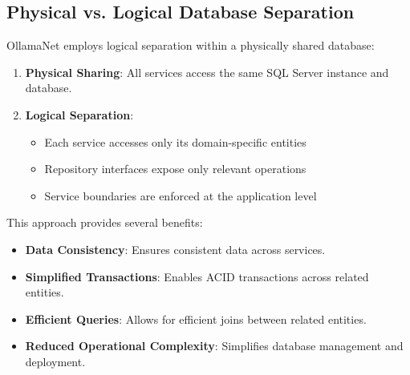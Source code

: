 \subsection{Physical vs. Logical Database Separation}

OllamaNet employs logical separation within a physically shared database:

\begin{enumerate}
   \item \textbf{Physical Sharing}: All services access the same SQL Server instance and database.

   \item \textbf{Logical Separation}:
   \begin{itemize}
      \item Each service accesses only its domain-specific entities
      \item Repository interfaces expose only relevant operations
      \item Service boundaries are enforced at the application level
   \end{itemize}
\end{enumerate}

This approach provides several benefits:

\begin{itemize}
   \item \textbf{Data Consistency}: Ensures consistent data across services.
   \item \textbf{Simplified Transactions}: Enables ACID transactions across related entities.
   \item \textbf{Efficient Queries}: Allows for efficient joins between related entities.
   \item \textbf{Reduced Operational Complexity}: Simplifies database management and deployment.
\end{itemize}


